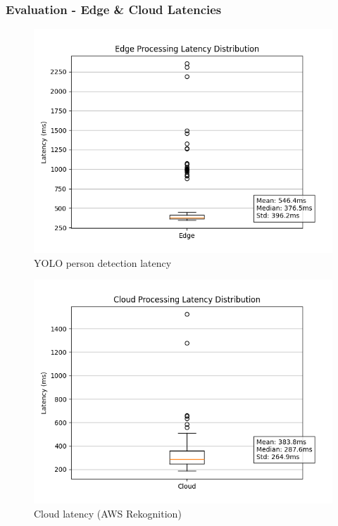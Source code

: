 \documentclass{beamer}
\begin{document}
\begin{frame}
\frametitle{Evaluation - Edge \& Cloud Latencies}

\begin{figure}
    \centering
    \begin{minipage}{0.48\textwidth}
        \centering
        \includegraphics[width=\linewidth]{./res/edge_latencies.png}
        YOLO person detection latency
    \end{minipage}
    \hfill
    \begin{minipage}{0.48\textwidth}
        \centering
        \includegraphics[width=\linewidth]{./res/cloud_latencies.png}
        Cloud latency (AWS Rekognition)
    \end{minipage}
\end{figure}

\end{frame}
\end{document}
